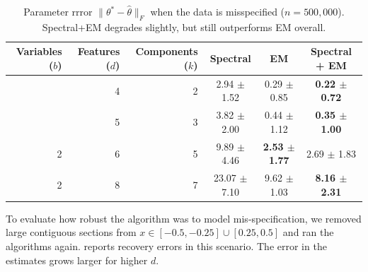 \begin{table}[t]
\caption{Parameter rrror $\|\theta^* - \hat \theta\|_F$ when the data is misspecified ($n = 500,000$).
Spectral+EM degrades slightly, but still outperforms EM overall.
}
\label{tbl:parameter-recovery-mis}
\vskip 0.15in
\begin{center}
\begin{small}
\begin{sc}

  \begin{tabular}{ r r r c c c }
\hline
\abovespace\belowspace
Variables ($b$) & Features ($d$) & Components ($k$) & Spectral & EM & Spectral + EM \\
\hline
\abovespace
 1 & 4 & 2 &  2.94 $\pm$ 1.52 & 0.29 $\pm$ 0.85 &  {\bf 0.22 $\pm$ 0.72} \\
\belowspace
 2 & 5 & 3 &  3.82 $\pm$ 2.00 & 0.44 $\pm$ 1.12 &  {\bf 0.35 $\pm$ 1.00} \\
 2 & 6 & 5 &  9.89 $\pm$ 4.46 & {\bf 2.53 $\pm$ 1.77} &  2.69 $\pm$ 1.83 \\
 2 & 8 & 7 & 23.07 $\pm$ 7.10 & 9.62 $\pm$ 1.03 &  {\bf 8.16 $\pm$ 2.31}  \\
\hline

\end{tabular}
\end{sc}
\end{small}
\end{center}
\vskip -0.1in
\end{table}

To evaluate how robust the algorithm was to model mis-specification, we
removed large contiguous sections from $x \in [-0.5,-0.25] \cup
[0.25,0.5]$ and ran the algorithms again.
 reports recovery errors in this
scenario. The error in the estimates grows larger for higher $d$.

